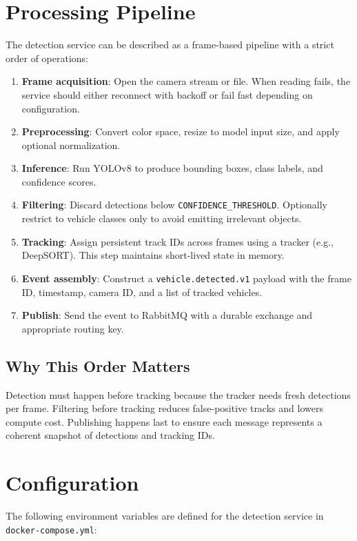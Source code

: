 \documentclass[11pt]{article}
\begin{document}
\section{Processing Pipeline}
The detection service can be described as a frame-based pipeline with a strict order of operations:

\begin{enumerate}
  \item \textbf{Frame acquisition}: Open the camera stream or file. When reading fails, the service should either reconnect with backoff or fail fast depending on configuration.
  \item \textbf{Preprocessing}: Convert color space, resize to model input size, and apply optional normalization.
  \item \textbf{Inference}: Run YOLOv8 to produce bounding boxes, class labels, and confidence scores.
  \item \textbf{Filtering}: Discard detections below \texttt{CONFIDENCE\_THRESHOLD}. Optionally restrict to vehicle classes only to avoid emitting irrelevant objects.
  \item \textbf{Tracking}: Assign persistent track IDs across frames using a tracker (e.g., DeepSORT). This step maintains short-lived state in memory.
  \item \textbf{Event assembly}: Construct a \texttt{vehicle.detected.v1} payload with the frame ID, timestamp, camera ID, and a list of tracked vehicles.
  \item \textbf{Publish}: Send the event to RabbitMQ with a durable exchange and appropriate routing key.
\end{enumerate}

\subsection*{Why This Order Matters}
Detection must happen before tracking because the tracker needs fresh detections per frame. Filtering before tracking reduces false-positive tracks and lowers compute cost. Publishing happens last to ensure each message represents a coherent snapshot of detections and tracking IDs.

\section{Configuration}
The following environment variables are defined for the detection service in \texttt{docker-compose.yml}:
\end{document}
